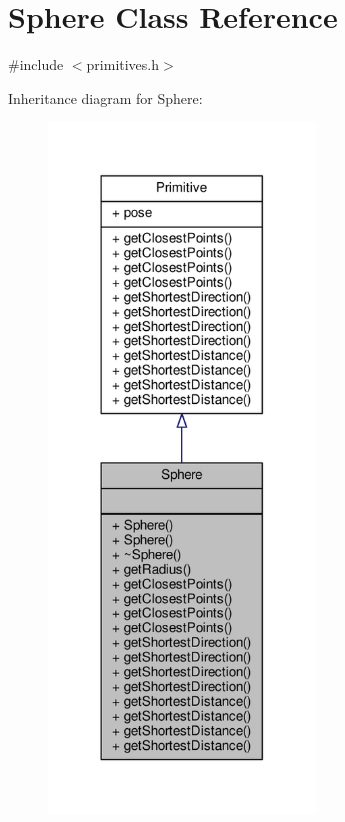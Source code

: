 \hypertarget{class_sphere}{}\section{Sphere Class Reference}
\label{class_sphere}


{\ttfamily \#include $<$primitives.\+h$>$}



Inheritance diagram for Sphere\+:
\nopagebreak
\begin{figure}[H]
\begin{center}
\leavevmode
\includegraphics[width=201pt]{class_sphere__inherit__graph}
\end{center}
\end{figure}


